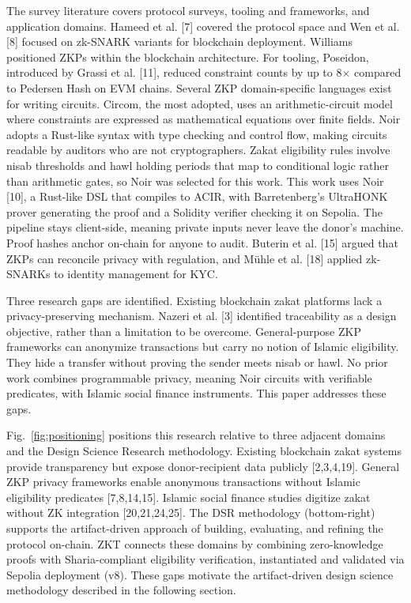 \documentclass[conference]{IEEEtran}
\begin{document}
The survey literature covers protocol surveys, tooling and frameworks, and application domains. Hameed et al. [7] covered the protocol space and Wen et al. [8] focused on zk-SNARK variants for blockchain deployment. Williams \cite{b_zkp_cacm} positioned ZKPs within the blockchain architecture. For tooling, Poseidon, introduced by Grassi et al. [11], reduced constraint counts by up to 8$\times$ compared to Pedersen Hash on EVM chains. Several ZKP domain-specific languages exist for writing circuits. Circom, the most adopted, uses an arithmetic-circuit model where constraints are expressed as mathematical equations over finite fields. Noir adopts a Rust-like syntax with type checking and control flow, making circuits readable by auditors who are not cryptographers. Zakat eligibility rules involve nisab thresholds and hawl holding periods that map to conditional logic rather than arithmetic gates, so Noir was selected for this work. This work uses Noir [10], a Rust-like DSL that compiles to ACIR, with Barretenberg's UltraHONK prover generating the proof and a Solidity verifier checking it on Sepolia. The pipeline stays client-side, meaning private inputs never leave the donor's machine. Proof hashes anchor on-chain for anyone to audit. Buterin et al. [15] argued that ZKPs can reconcile privacy with regulation, and M\"{u}hle et al. [18] applied zk-SNARKs to identity management for KYC.

Three research gaps are identified. Existing blockchain zakat platforms lack a privacy-preserving mechanism. Nazeri et al. [3] identified traceability as a design objective, rather than a limitation to be overcome. General-purpose ZKP frameworks can anonymize transactions but carry no notion of Islamic eligibility. They hide a transfer without proving the sender meets nisab or hawl. No prior work combines programmable privacy, meaning Noir circuits with verifiable predicates, with Islamic social finance instruments. This paper addresses these gaps.

Fig.~\ref{fig:positioning} positions this research relative to three adjacent domains and the Design Science Research methodology. Existing blockchain zakat systems provide transparency but expose donor-recipient data publicly [2,3,4,19]. General ZKP privacy frameworks enable anonymous transactions without Islamic eligibility predicates [7,8,14,15]. Islamic social finance studies digitize zakat without ZK integration [20,21,24,25]. The DSR methodology (bottom-right) supports the artifact-driven approach of building, evaluating, and refining the protocol on-chain. ZKT connects these domains by combining zero-knowledge proofs with Sharia-compliant eligibility verification, instantiated and validated via Sepolia deployment (v8). These gaps motivate the artifact-driven design science methodology described in the following section.
\end{document}
